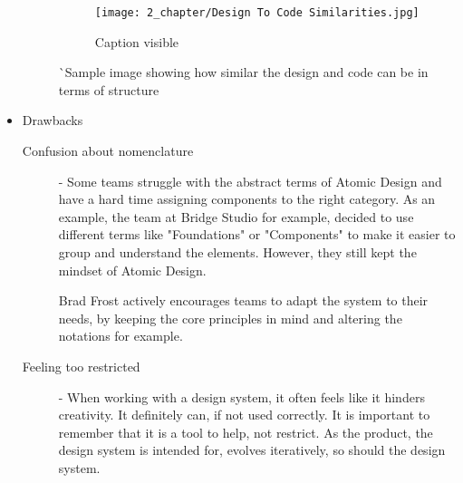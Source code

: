 \begin{itemize}
\begin{description}
		            \begin{figure}[h!]
			            \begin{center}
				            \texttt{[image: 2\_chapter/Design To Code Similarities.jpg]}
				            \caption[Caption (url)]{Caption visible}
			            \end{center}
		            \end{figure}
		            ^^ Sample image showing how similar the design and code can be in terms of structure
	      \end{description}
	\item Drawbacks
	      \begin{description}
		      \item[Confusion about nomenclature] - Some teams struggle with the abstract terms of
		            Atomic Design and have a hard time assigning components to the right category.
		            As an example, the team at Bridge Studio for example, decided to use different
		            terms like "Foundations" or "Components" to make it easier to group and
		            understand the elements. However, they still kept the mindset of Atomic Design.

		            Brad Frost actively encourages teams to adapt the system to their needs, by
		            keeping the core principles in mind and altering the notations for example.
		      \item[Feeling too restricted] - When working with a design system, it often feels like
		            it hinders creativity. It definitely can, if not used correctly. It is important
		            to remember that it is a tool to help, not restrict. As the product, the design
		            system is intended for, evolves iteratively, so should the design system.
	      \end{description}
\end{itemize}

